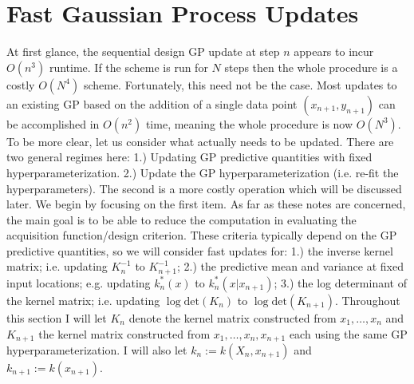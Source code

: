 \documentclass[12pt]{article}
\begin{document}
\section{Fast Gaussian Process Updates}
At first glance, the sequential design GP update at step $n$ appears to incur $O(n^3)$ runtime. If the scheme is run for $N$ steps 
then the whole procedure is a costly $O(N^4)$ scheme. Fortunately, this need not be the case. Most updates to an existing 
GP based on the addition of a single data point $(x_{n+1}, y_{n+1})$ can be accomplished in $O(n^2)$ time, meaning the whole procedure 
is now $O(N^3)$. To be more clear, let us consider what actually needs to be updated. There are two general regimes here:
1.) Updating GP predictive quantities with fixed hyperparameterization. 
2.) Update the GP hyperparameterization (i.e. re-fit the hyperparameters). 
The second is a more costly operation which will be discussed later. We begin by focusing on the first item. As far as these notes are concerned, the main goal is to be able to reduce the computation in evaluating the acquisition function/design criterion. These 
criteria typically depend on the GP predictive quantities, so we will consider fast updates for: 1.) the inverse kernel matrix; 
i.e. updating $K_n^{-1}$ to $K_{n+1}^{-1}$; 2.) the predictive mean and variance at fixed input locations; e.g. updating $k_n^*(x)$ to $k_n^*(x|x_{n+1})$; 3.) the log determinant of the kernel matrix; i.e. updating $\log \text{det}(K_n)$ to 
$\log \text{det}(K_{n+1})$. Throughout this section I will let $K_n$ denote the kernel matrix constructed from 
$x_1, \dots, x_n$ and $K_{n+1}$ the kernel matrix constructed from $x_1, \dots, x_n, x_{n+1}$ each using the same GP 
hyperparameterization. I will also let $k_n := k(X_n, x_{n+1})$ and $k_{n+1} := k(x_{n+1})$. 
\end{document}
